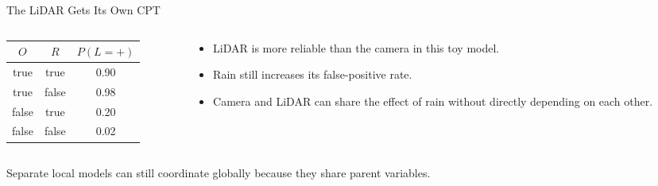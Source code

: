 \documentclass[aspectratio=169,10pt]{beamer}
\begin{document}
\begin{frame}[shrink=10]{The LiDAR Gets Its Own CPT}
  \begin{columns}[T,onlytextwidth]
    \begin{column}{0.53\textwidth}
      \begin{center}
      \renewcommand{\arraystretch}{1.25}
      \begin{tabular}{c|c|c}
        \textbf{$O$} & \textbf{$R$} & \textbf{$P(L=+)$} \\\hline
        true & true & 0.90 \\
        true & false & 0.98 \\
        false & true & 0.20 \\
        false & false & 0.02
      \end{tabular}
      \end{center}
    \end{column}
    \begin{column}{0.41\textwidth}
      \begin{itemize}
        \item LiDAR is more reliable than the camera in this toy model.
        \item Rain still increases its false-positive rate.
        \item Camera and LiDAR can share the effect of rain without directly depending on each other.
      \end{itemize}
    \end{column}
  \end{columns}

  \begin{keyidea}
    Separate local models can still coordinate globally because they share parent variables.
  \end{keyidea}
\end{frame}
\end{document}
